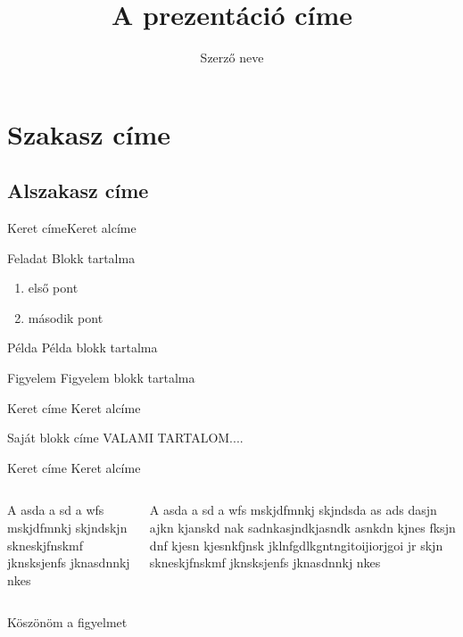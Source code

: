 \documentclass[aspectratio=169]{beamer}
\newenvironment{myblock}[1]
{\begin{beamerboxesrounded}[shadow, upper=myblockupper, lower=myblocklower]{#1}}
{\end{beamerboxesrounded}}
\begin{document}
\title[Cím]{A prezentáció címe}
\author[Név]{Szerző neve}
\maketitle

\section{Szakasz címe}
\subsection{Alszakasz címe}
\begin{frame}{Keret címe}{Keret alcíme}
\pause
\begin{block}{Feladat}
Blokk tartalma
\pause
\begin{enumerate}
	\item első pont \pause
	\item második pont
\end{enumerate}
\end{block}
\pause
\begin{exampleblock}{Példa}
	Példa blokk tartalma
\end{exampleblock}
\begin{alertblock}{Figyelem}
	Figyelem blokk tartalma
\end{alertblock}

\end{frame}

\begin{frame} {Keret címe} {Keret alcíme}

\begin{myblock}{Saját blokk címe}
	VALAMI TARTALOM....
\end{myblock}
\end{frame}

\begin{frame}{Keret címe} {Keret alcíme}
\begin{columns}[t]
\begin{column}{5cm}
A asda a sd a wfs mskjdfmnkj skjndskjn skneskjfnskmf jknsksjenfs jknasdnnkj nkes 
\end{column}
\begin{column}{5cm}
	A asda a sd a wfs mskjdfmnkj skjndsda as ads dasjn ajkn kjanskd nak  sadnkasjndkjasndk asnkdn kjnes fksjn dnf kjesn kjesnkfjnsk jklnfgdlkgntngitoijiorjgoi jr skjn skneskjfnskmf jknsksjenfs jknasdnnkj nkes 
\end{column}
\end{columns}
\end{frame}

\begin{frame}[plain]
\begin{center}
{\Huge Köszönöm a figyelmet}
\end{center}
\end{frame}
\end{document}
